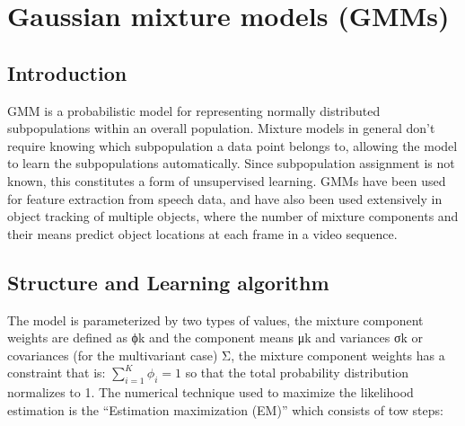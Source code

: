 

\pagestyle{fancy} 
\chapter{Gaussian mixture models (GMMs)}
\label{cha:2}
\vspace{1cm}

\section{Introduction}

GMM is a probabilistic model for representing normally distributed subpopulations within an overall population. Mixture models in general don't require knowing which subpopulation a data point belongs to, allowing the model to learn the subpopulations automatically. Since subpopulation assignment is not known, this constitutes a form of unsupervised learning. GMMs have been used for feature extraction from speech data, and have also been used extensively in object tracking of multiple objects, where the number of mixture components and their means predict object locations at each frame in a video sequence.

\section{Structure and Learning algorithm}
The model is parameterized by two types of values, the mixture component weights are defined as ϕk and the component means μk and variances σk or covariances (for the multivariant case) Σ, the mixture component weights has a constraint that is:  $\sum_{i=1}^{K} \phi_i = 1$ so that the total probability distribution normalizes to 1. The numerical technique used to maximize the likelihood estimation is the “Estimation maximization (EM)” which consists of tow steps:

